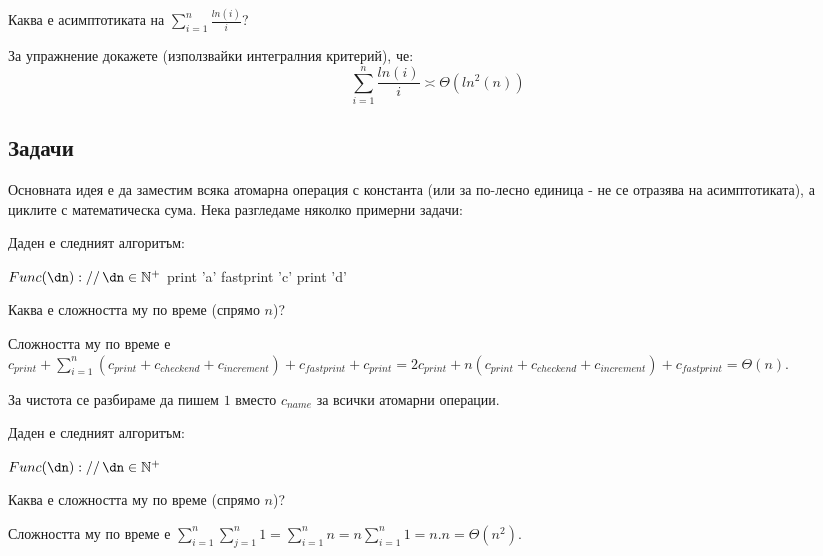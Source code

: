 \begin{application}
	Каква е асимптотиката на $\sum\limits_{i=1}^n\frac{ln(i)}{i}$?
\end{application}
\begin{solution}
	За упражнение докажете (използвайки интегралния критерий), че:
	\begin{equation*}
		\sum\limits_{i=1}^n\frac{ln(i)}{i}\asymp\Theta(ln^2(n))
	\end{equation*}
\end{solution}\leavevmode\newline


\subsection{Задачи}

Основната идея е да заместим всяка атомарна операция с константа (или за по-лесно единица - не се отразява на асимптотиката), а циклите с математическа сума. Нека разгледаме няколко примерни задачи:\\

\begin{problem}
	Даден е следният алгоритъм:
	\begin{pseudocode}
		
		$Func(\dn)://\,\dn\in\mathbb{N}^+$
		\Mybegin
		{
			print 'a'\;
			fastprint 'c'\;
			print 'd'\;
		}
	\end{pseudocode}
	Каква е сложността му по време (спрямо $n$)?
\end{problem}
\begin{solution}
	Сложността му по време е $c_{print}+\sum\limits_{i=1}^n(c_{print}+c_{checkend}+c_{increment})+c_{fastprint}+c_{print}=2c_{print}+n(c_{print}+c_{checkend}+c_{increment})+c_{fastprint}=\Theta(n)$.
\end{solution}

\begin{remark*}
	За чистота се разбираме да пишем $1$ вместо $c_{name}$ за всички атомарни операции.
\end{remark*}\leavevmode\newline

\begin{problem}
	Даден е следният алгоритъм:
	\begin{pseudocode}
		\SetKwData{di}{i}
		\SetKwData{dj}{j}
		\SetKwData{dn}{n}
		
		$Func(\dn)://\,\dn\in\mathbb{N}^+$
		\Mybegin
		{
			\Myfor{$\di\leftarrow1$ \KwTo $\dn$}
			{
				\Myfor{$\dj\leftarrow1$ \KwTo $\dn$}{print 'a'\;}
			}
		}
	\end{pseudocode}
	Каква е сложността му по време (спрямо $n$)?
\end{problem}
\begin{solution}
	Сложността му по време е $\sum\limits_{i=1}^n\sum\limits_{j=1}^n1=\sum\limits_{i=1}^n n=n\sum\limits_{i=1}^n 1=n.n=\Theta(n^2)$.
\end{solution}\leavevmode\newline


